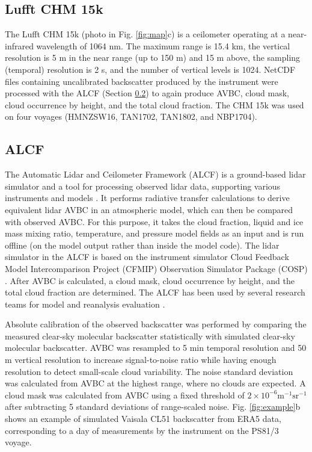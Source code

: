 \documentclass[12pt,a4paper]{article}
\begin{document}
\subsection{Lufft CHM 15k}
\label{sec:chm15k}

The Lufft CHM 15k (photo in Fig. \ref{fig:map}c) is a ceilometer operating at a
near-infrared wavelength of 1064 nm. The maximum range is 15.4 km, the vertical
resolution is 5 m in the near range (up to 150 m) and 15 m above, the sampling
(temporal) resolution is 2 s, and the number of vertical levels is 1024.
NetCDF files containing uncalibrated backscatter produced by the instrument
were processed with the ALCF (Section \ref{sec:alcf}) to again produce AVBC,
cloud mask, cloud occurrence by height, and the total cloud fraction. The CHM
15k was used on four voyages (HMNZSW16, TAN1702, TAN1802, and NBP1704).

\subsection{ALCF}
\label{sec:alcf}

The Automatic Lidar and Ceilometer Framework (ALCF) is a ground-based lidar
simulator and a tool for processing observed lidar data, supporting various
instruments and models \citep{kuma2021}. It performs radiative transfer
calculations to derive equivalent lidar AVBC in an atmospheric model, which can
then be compared with observed AVBC. For this purpose, it takes the cloud
fraction, liquid and ice mass mixing ratio, temperature, and pressure model
fields as an input and is run offline (on the model output rather than inside
the model code). The lidar simulator in the ALCF is based on the instrument
simulator Cloud Feedback Model Intercomparison Project (CFMIP) Observation
Simulator Package (COSP) \citep{bodas-salcedo2011}.  After AVBC is calculated,
a cloud mask, cloud occurrence by height, and the total cloud fraction are
determined. The ALCF has been used by several research teams for model and
reanalysis evaluation
\citep{kuma2020,kremser2021,guyot2022,pei2023,whitehead2023,mcdonald2024}.

Absolute calibration of the observed backscatter was performed by comparing the
measured clear-sky molecular backscatter statistically with simulated clear-sky
molecular backscatter. AVBC was resampled to 5 min temporal resolution and 50 m
vertical resolution to increase signal-to-noise ratio while having enough
resolution to detect small-scale cloud variability. The noise standard
deviation was calculated from AVBC at the highest range, where no clouds are
expected.  A cloud mask was calculated from AVBC using a fixed threshold of
$\mathrm{2\times 10^{-6} m^{-1}sr^{-1}}$ after subtracting 5 standard
deviations of range-scaled noise. Fig. \ref{fig:example}b shows an example of
simulated Vaisala CL51 backscatter from ERA5 data, corresponding to a day of
measurements by the instrument on the PS81/3 voyage.
\end{document}
